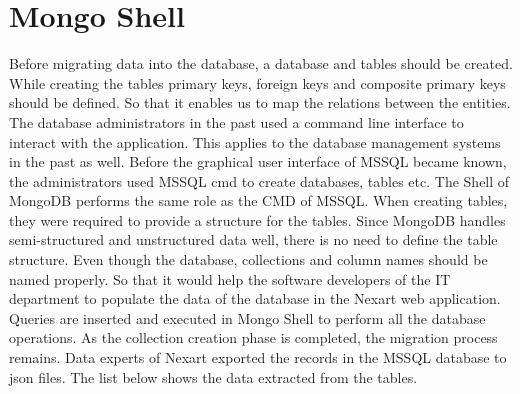 \documentclass[a4Paper,12pt]{report}
\begin{document}
\section{Mongo Shell}
Before migrating data into the database, a database and tables should be created. While creating the tables primary keys, foreign keys and composite primary keys should be defined. So that it enables us to map the relations between the entities. The database administrators in the past used a command line interface to interact with the application. This applies to the database management systems in the past as well. Before the graphical user interface of MSSQL became known, the administrators used MSSQL cmd to create databases, tables etc. The Shell of MongoDB performs the same role as the CMD of MSSQL. When creating tables, they were required to provide a structure for the tables. Since MongoDB handles semi-structured and unstructured data well, there is no need to define the table structure. Even though the database, collections and column names should be named properly. So that it would help the software developers of the IT department to populate the data of the database in the Nexart web application. Queries are inserted and executed in Mongo Shell to perform all the database operations. As the collection creation phase is completed, the migration process remains. Data experts of Nexart exported the records in the MSSQL database to json files. The list below shows the data extracted from the tables.
\end{document}
